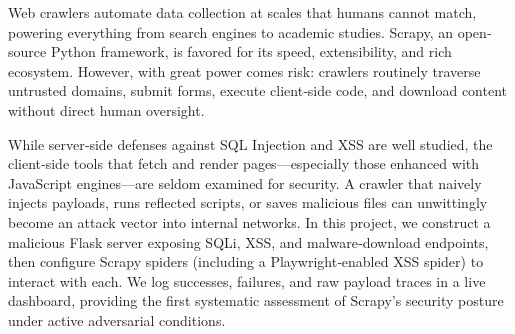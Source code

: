 

Web crawlers automate data collection at scales that humans cannot match, powering everything from search engines to academic studies. Scrapy, an open‐source Python framework, is favored for its speed, extensibility, and rich ecosystem. However, with great power comes risk: crawlers routinely traverse untrusted domains, submit forms, execute client‐side code, and download content without direct human oversight.

While server‐side defenses against SQL Injection and XSS are well studied, the client‐side tools that fetch and render pages—especially those enhanced with JavaScript engines—are seldom examined for security. A crawler that naively injects payloads, runs reflected scripts, or saves malicious files can unwittingly become an attack vector into internal networks. In this project, we construct a malicious Flask server exposing SQLi, XSS, and malware‐download endpoints, then configure Scrapy spiders (including a Playwright‐enabled XSS spider) to interact with each. We log successes, failures, and raw payload traces in a live dashboard, providing the first systematic assessment of Scrapy’s security posture under active adversarial conditions.

